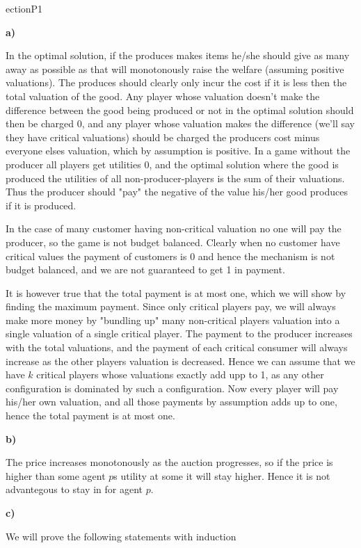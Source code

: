 ection{P1}

\textbf{a)}

In the optimal solution, if the produces makes items he/she should give as many away as possible as that will monotonously raise the welfare (assuming positive valuations). The produces should clearly only incur the cost if it is less then the total valuation of the good. Any player whose valuation doesn't make the difference between the good being produced or not in the optimal solution should then be charged 0, and any player whose valuation makes the difference (we'll say they have critical valuations) should be charged the producers cost minus everyone elses valuation, which by assumption is positive. In a game without the producer all players get utilities 0, and the optimal solution where the good is produced the utilities of all non-producer-players is the sum of their valuations. Thus the producer should "pay" the negative of the value his/her good produces if it is produced.

In the case of many customer having non-critical valuation no one will pay the producer, so the game is not budget balanced. Clearly when no customer have critical values the payment of customers is 0 and hence the mechanism is not budget balanced, and we are not guaranteed to get 1 in payment.

It is however true that the total payment is at most one, which we will show by finding the maximum payment. Since only critical players pay, we will always make more money by "bundling up" many non-critical players valuation into a single valuation of a single critical player. The payment to the producer increases with the total valuations, and the payment of each critical consumer will always increase as the other players valuation is decreased. Hence we can assume that we have $k$ critical players whose valuations exactly add upp to 1, as any other configuration is dominated by such a configuration. Now every player will pay his/her own valuation, and all those payments by assumption adds up to one, hence the total payment is at most one.

\textbf{b)}

The price increases monotonously as the auction progresses, so if the price is higher than some agent $p$s utility at some it will stay higher. Hence it is not advantegous to stay in for agent $p$.

\textbf{c)}

We will prove the following statements with induction

